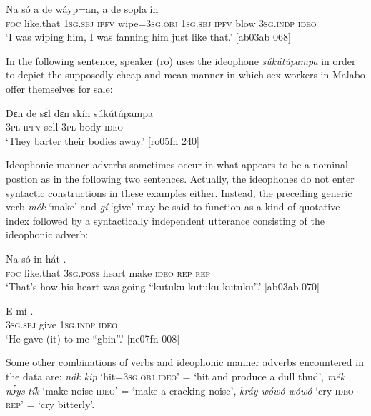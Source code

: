 \ea%
    \label{ex:key:1631}
    \gll Na  só    a    de  wáyp=an,  a    de  sopla  ín    \\
\textsc{foc}  like.that  \textsc{1sg.sbj}  \textsc{ipfv}  wipe=\textsc{3sg.obj}  \textsc{1sg.sbj}  \textsc{ipfv}  blow  \textsc{3sg.indp}  \textsc{ideo}\\

\glt ‘I was wiping him, I was fanning him just like that.’ [ab03ab 068]
\z

In the following sentence, speaker (ro) uses the ideophone \textit{súkútúpampa} in order to depict the supposedly cheap and mean manner in which sex workers in Malabo offer themselves for sale: 


\ea%
    \label{ex:key:1632}
    \gll Dɛn  de  sɛ́l  dɛn  skín    súkútúpampa\\
\textsc{3pl}  \textsc{ipfv}  sell  \textsc{3pl}  body  \textsc{ideo}\\

\glt ‘They barter their bodies away.’ [ro05fn 240]
\z

Ideophonic manner adverbs sometimes occur in what appears to be a nominal postion as in the following two sentences. Actually, the ideophones do not enter syntactic constructions in these examples either. Instead, the preceding generic verb \textit{mék} ‘make’ and \textit{gí} ‘give’ may be said to function as a kind of quotative index followed by a syntactically independent utterance consisting of the ideophonic adverb: 


\ea%
    \label{ex:key:1633}
    \gll Na  só    in    hát            .\\
\textsc{foc}  like.that  \textsc{3sg.poss}  heart  make  \textsc{ideo}    \textsc{rep}    \textsc{rep}\\

\glt ‘That’s how his heart was going “kutuku kutuku kutuku”.’ [ab03ab 070]
\z


\ea%
    \label{ex:key:1634}
    \gll E      mí    .\\
\textsc{3sg.sbj}  give  \textsc{1sg.indp}  \textsc{ideo}\\

\glt ‘He gave (it) to me “gbin”.’ [ne07fn 008]
\z

Some other combinations of verbs and ideophonic manner adverbs encountered in the data are: \textit{nák kìp} ‘hit=\textsc{3sg.obj} \textsc{ideo’} = ‘hit and produce a dull thud’, \textit{mék nɔ́ys} \textit{tík} ‘make noise \textsc{ideo}’ = ‘make a cracking noise’, \textit{kráy wówó wówó} ‘cry \textsc{ideo} \textsc{rep’} = ‘cry bitterly’.

